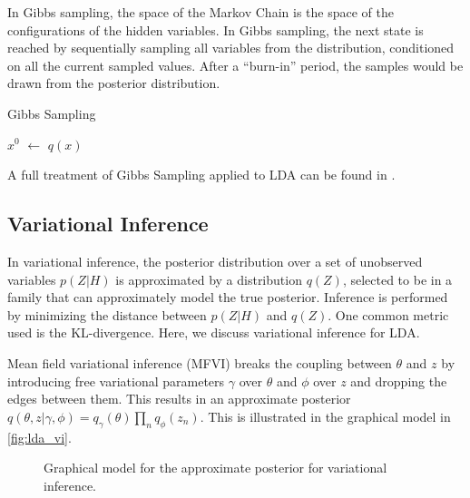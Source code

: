 \documentclass[letterpaper]{article}
\begin{document}
In Gibbs sampling, the space of the Markov Chain is the space of the
configurations of the hidden variables. In Gibbs sampling, the next
state is reached by sequentially sampling all variables from the
distribution, conditioned on all the current sampled values. After a
``burn-in'' period, the samples would be drawn from the posterior
distribution.

\begin{algorithm}
\caption{Gibbs Sampling}\label{alg:gibbs}
\begin{algorithmic}[1]
  \State $x^{0}$ $\gets$ $q(x)$
  \EndFor
  \EndFor
\end{algorithmic}
\end{algorithm}

A full treatment of Gibbs Sampling applied to LDA can be found in
\cite{griffiths2002gibbs}.

\subsection{Variational Inference}
\label{subsec:vi}
In variational inference, the posterior distribution over a set of
unobserved variables $p(Z|H)$ is approximated by a distribution
$q(Z)$, selected to be in a family that can approximately model the
true posterior. Inference is performed by minimizing the distance
between $p(Z|H)$ and $q(Z)$. One common metric used is the
KL-divergence. Here, we discuss variational inference for LDA.

Mean field variational inference (MFVI) breaks the coupling between
$\theta$ and $z$ by introducing free variational parameters $\gamma$
over $\theta$ and $\phi$ over $z$ and dropping the edges between them.
This results in an approximate posterior $q(\theta, z | \gamma, \phi)
= q_\gamma(\theta)\prod_nq_\phi(z_n)$. This is illustrated in the
graphical model in \autoref{fig:lda_vi}.

\begin{figure}[ht]
  \centering
  \caption{\label{fig:lda_vi} Graphical model for the approximate
    posterior for variational inference.}
\end{figure}
\end{document}
